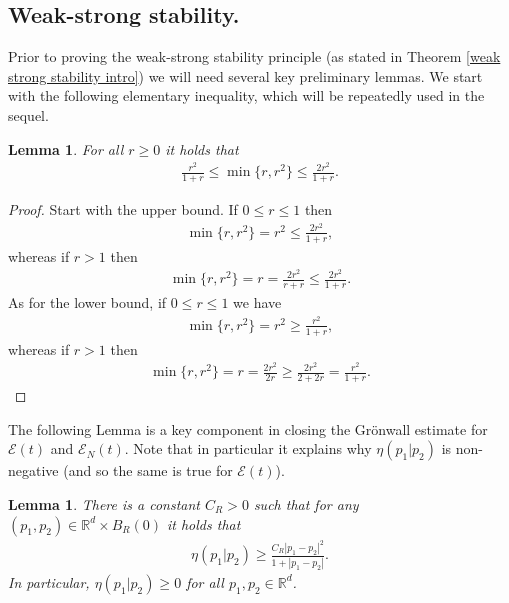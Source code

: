 \documentclass[11pt,reqno]{amsart}
\newtheorem{lem}[thm]{Lemma}
\numberwithin{equation}{section}
\begin{document}
\subsection{Weak-strong stability.} Prior to proving the weak-strong stability principle (as stated in Theorem \ref{weak strong stability intro}) we will need several key preliminary lemmas.  We start with the following elementary inequality, which will be repeatedly used in the sequel.  
\begin{lem}\label{elementary ine about min}
For all $r\geq 0$ it holds that 
\begin{align*}
\frac{r^{2}}{1+r}\leq \min\{r,r^{2}\}\leq \frac{2r^{2}}{1+r}.     
\end{align*}
\end{lem}
\begin{proof}
Start with the upper bound. If $0\leq r\leq 1$ then 
\begin{align*}
\min\{r,r^{2}\}=r^{2}\leq \frac{2r^{2}}{1+r},    
\end{align*}
whereas if $r>1$ then 
\begin{align*}
\min\{r,r^{2}\}=r=\frac{2r^{2}}{r+r}\leq \frac{2r^{2}}{1+r}.     
\end{align*}
As for the lower bound, if $0\leq r\leq 1$ we have 
\begin{align*}
\min\{r,r^{2}\}=r^{2}\geq \frac{r^{2}}{1+r},    
\end{align*}
whereas if $r>1$ then 
\begin{align*}
\min\{r,r^{2}\}=r=\frac{2r^{2}}{2r}\geq \frac{2r^{2}}{2+2r}=\frac{r^{2}}{1+r}.      
\end{align*}
\end{proof}
The following Lemma is a key component in  closing the Gr\"onwall estimate for $\mathcal{E}(t)$ and  $\mathcal{E}_{N}(t)$. Note that in particular it explains why $\eta(p_{1}\vert p_{2})$ is non-negative (and so the same is true for $\mathcal{E}(t)$).   
\begin{lem}\label{coercivity positivity of eta}
There is a constant $C_{R}>0$ such that for any $(p_{1},p_{2})\in \mathbb{R}^{d}\times B_{R}(0)$ it holds that 
 \begin{align*}
 \eta(p_{1}\vert p_{2})\geq \frac{C_{R}\left\vert p_{1}-p_{2}\right\vert^{2}}{1+\left\vert p_{1}-p_{2}\right\vert}.     
 \end{align*}
In particular, $\eta(p_{1}\vert p_{2})\geq 0$ for all $p_{1},p_{2}\in \mathbb{R}^{d}$. 
\end{lem}
\end{document}
